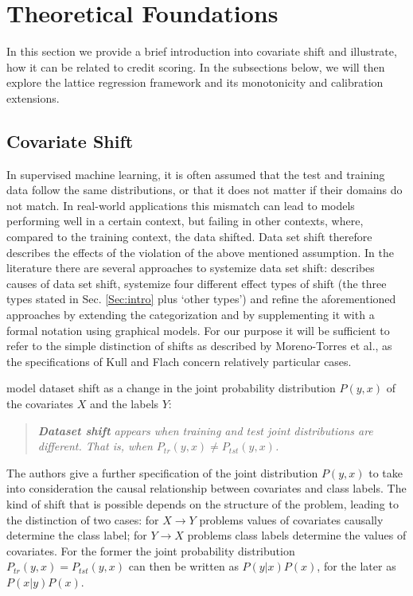 \section{Theoretical Foundations}\label{Sec:Method}

In this section we provide a brief introduction into covariate shift and illustrate, how it can be related to credit scoring. In the subsections below, we will then explore the lattice regression framework and its monotonicity and calibration extensions.

\subsection{Covariate Shift}\label{Sec:covshift}

In supervised machine learning, it is often assumed that the test and training data follow the same distributions, or that it does not matter if their domains do not match. In real-world applications this mismatch can lead to models performing well in a certain context, but failing in other contexts, where, compared to the training context, the data shifted. Data set shift therefore describes the effects of the violation of the above mentioned assumption. In the literature there are several approaches to systemize data set shift: \citep{storkey2009training} describes causes of data set shift, \citep{moreno2012unifying} systemize four different effect types of shift (the three types stated in Sec. \ref{Sec:intro} plus `other types') and \citep{kull2014patterns} refine the aforementioned approaches by extending the categorization and by supplementing it with a formal notation using graphical models. For our purpose it will be sufficient to refer to the simple distinction of shifts as described by Moreno-Torres et al., as the specifications of Kull and Flach concern relatively particular cases. 

\citep{moreno2012unifying} model dataset shift as a change in the joint probability distribution $P(y,x)$ of the covariates $X$ and the labels $Y$: 
\begin{quote}
	{\it \textbf{Dataset shift} appears when training and test joint distributions are different. That is, when $P_{tr}(y,x) \neq P_{tst}(y,x)$.}
\end{quote}

The authors give a further specification of the joint distribution $P(y,x)$ to take into consideration the causal relationship between covariates and class labels. The kind of shift that is possible depends on the structure of the problem, leading to the distinction of two cases: for $X \rightarrow Y$ problems values of covariates causally determine the class label; for $Y \rightarrow X$ problems class labels determine the values of covariates. For the former the joint probability distribution $P_{tr}(y,x) = P_{tst}(y,x)$ can then be written as $P(y|x)P(x)$, for the later as $P(x|y)P(x)$. 

